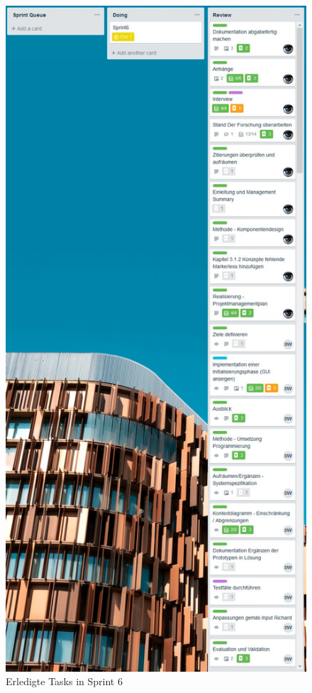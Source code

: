 \documentclass[a4paper]{scrreprt}
\begin{document}
\newpage

\begin{figure}[h!]
	\centering
	\includegraphics[keepaspectratio,height=\textheight]{SprintReview_6}
	\caption*{Erledigte Tasks in Sprint 6}
\end{figure}
\end{document}
